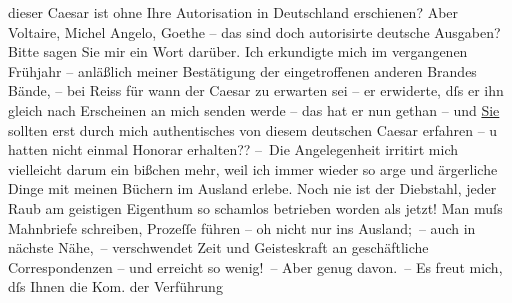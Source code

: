 \begin{ledgroupsized}[t]{13cm}
               dieser Caesar ist ohne Ihre Autorisation in Deutschland erschienen? Aber Voltaire, Michel Angelo, Goethe – das sind doch autorisirte deutsche
               Ausgaben? Bitte sagen Sie mir ein Wort darüber. Ich erkundigte mich im vergangenen
               Frühjahr – anläßlich meiner Bestätigung der eingetroffenen anderen Brandes Bände, –
                  \introOben{}bei Reiss\introOben{} für wann der Caesar zu erwarten sei – er
               erwiderte, dſs er ihn gleich nach Erscheinen an mich senden werde – das hat er {\pb}nun gethan – und \uline{Sie} sollten erst durch mich authentisches von diesem deutschen Caesar erfahren – u hatten nicht einmal Honorar
               erhalten??\pend
           \pstart
           – Die Angelegenheit irritirt mich vielleicht darum ein bißchen mehr, weil ich immer
               wieder so arge und ärgerliche Dinge mit meinen Büchern im Ausland erlebe. Noch nie
               ist der Diebstahl, jeder Raub am geistigen Eigenthum so schamlos betrieben worden als
               jetzt! Man muſs Mahnbriefe schreiben, Prozeſſe führen – oh nicht nur ins Ausland; –
               auch in nächste Nähe, – verschwendet Zeit und Geisteskraft an geschäftliche
               Correspondenzen – und erreicht so wenig! – Aber genug davon. –\pend
           \pstart
           Es freut mich, dſs Ihnen die Kom. der Verführung

\end{ledgroupsized}

